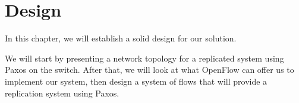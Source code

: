 \chapter{Design}
\label{chapter:design}

In this chapter, we will establish a solid design for our solution.

We will start by presenting a network topology for a replicated system using
Paxos on the switch.  After that, we will look at what OpenFlow can offer us
to implement our system, then design a system of flows that will provide a
replication system using Paxos.




